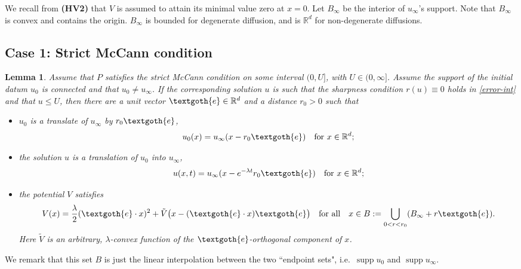 \documentclass[reqno]{amsart}
\newtheorem{lemma}{Lemma}[section]
\newcommand{\R}{\mathbb{R}}
\DeclareMathOperator{\supp}{supp}
\begin{document}
We recall from {\bf (HV2)} that $V$ is assumed to attain its minimal value zero at $x=0$.
Let $B_\infty$ be the interior of $u_\infty$'s support. Note that $B_\infty$ is convex and contains the origin. $B_\infty$ is bounded for degenerate diffusion, and is $\R^d$ for non-degenerate diffusions. 

\subsection{Case 1: Strict McCann condition}
%
\begin{lemma}\label{lem:9.1}
    Assume that $P$ satisfies the strict McCann condition on some interval $(0,U]$, with $U\in(0,\infty]$. Assume the support of the initial datum $u_0$ is connected and that $u_0\neq u_\infty$.  If the corresponding solution $u$ is such that the sharpness condition $r(u)\equiv 0$ holds in \eqref{error-int} and that $u\le U$, then there are a unit vector $\textgoth{e}\in\R^d$ and a distance $r_0>0$ such that
  \begin{itemize}
  \item[(a)] $u_0$ is a translate of $u_\infty$ by $r_0\textgoth{e}$,
    \begin{align}
      \label{eq:u0opt}
      u_0(x)=u_\infty(x-r_0\textgoth{e})\quad \mbox{for } x\in\R^d;
    \end{align}
  \item[(b)] the solution $u$ is a translation of $u_0$ into $u_\infty$,
    \begin{align}
      \label{eq:uopt}
      u(x,t) = u_\infty(x-e^{-\lambda t}r_0\textgoth{e})\quad \mbox{for } x\in\R^d;
    \end{align}
  \item[(c)] the potential $V$ satisfies 
    \begin{align}
      \label{eq:Vopt}
      V(x) = \frac\lambda2(\textgoth{e}\cdot x)^2 
      + \tilde V\big(x-(\textgoth{e}\cdot x)\textgoth{e}\big)
      \quad \text{for all}\quad x\in B:=\bigcup_{0<r<r_0}(B_\infty+r\textgoth{e}).
    \end{align}
    Here $\tilde V$ is an arbitrary, $\lambda$-convex function of the $\textgoth{e}$-orthogonal component of $x$.
 \end{itemize}  
\end{lemma}
%
We remark that this set  $B$ is just the linear interpolation between the two ``endpoint sets", i.e.\ $\supp u_0$ and $\supp u_\infty$.\\
\end{document}
